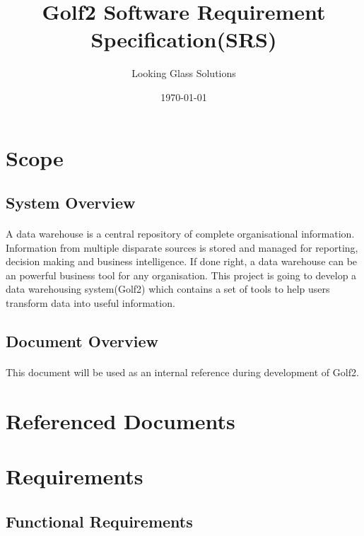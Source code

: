 \documentclass[11pt]{article}
\title{Golf2 Software Requirement Specification(SRS)}
\author{Looking Glass Solutions}
\date{\today}
\begin{document}
\maketitle
\tableofcontents
\newpage

\section{Scope}
\subsection{System Overview}
\paragraph{} A data warehouse is a central repository of complete organisational information. Information from multiple disparate sources is stored and managed for reporting, decision making and business intelligence. If done right, a data warehouse can be an powerful business tool for any organisation. This project is going to develop a data warehousing system(Golf2) which contains a set of tools to help users transform data into useful information.
\subsection{Document Overview}
\paragraph{} This document will be used as an internal reference during development of Golf2.

\section{Referenced Documents}

\section{Requirements}
\subsection{Functional Requirements}
\end{document}
